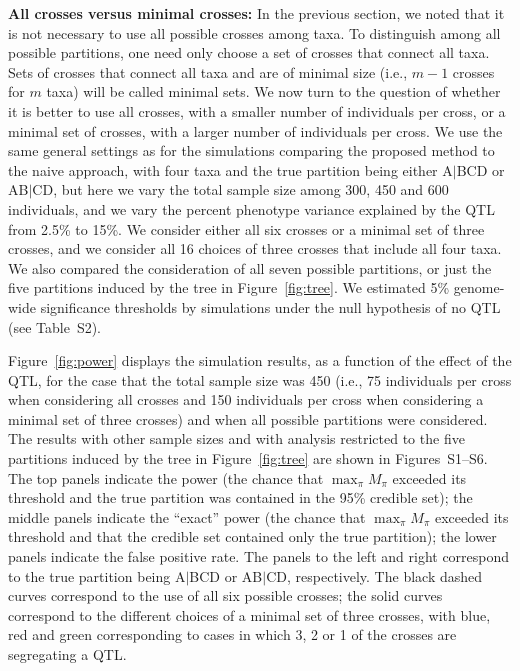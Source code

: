 \documentclass[12pt,letterpaper]{article}
\begin{document}
\textbf{All crosses versus minimal crosses:} In the previous section, we noted
that it is not necessary to use all possible crosses among taxa.  
To
distinguish among all possible partitions,
one need only choose a set of crosses that connect all taxa.
Sets of crosses that connect all taxa and are of minimal size (i.e.,
$m-1$ crosses for $m$ taxa) will be called minimal sets.  We
now turn to the question of whether it is better to use all crosses,
with a smaller number of individuals per cross, or a minimal set of 
crosses, with a larger number of individuals per cross.  We use the
same general settings as for the simulations comparing the proposed
method to the naive approach, with four taxa and the true partition
being either A$|$BCD or AB$|$CD, but here we vary the total sample size
among 300, 450 and 600 individuals, and we vary the percent phenotype
variance explained by the QTL from 2.5\% to 15\%.  We consider either
all six crosses or a minimal set of three crosses, and we consider all
16 choices of three crosses that include all four taxa.  We also
compared the consideration of all seven possible partitions, or just
the five partitions induced by the tree in Figure~\ref{fig:tree}.  We estimated 5\%
genome-wide significance thresholds by simulations under
the null hypothesis of no QTL (see Table~S2).

Figure~\ref{fig:power} displays the simulation results, as a function
of the effect of the QTL, for the case that the total sample size was
450 (i.e., 75 individuals per cross when considering all crosses and
150 individuals per cross when considering a minimal set of three
crosses) and when all possible partitions were considered.  The
results with other sample sizes and with analysis restricted to the
five partitions induced by the tree in Figure~\ref{fig:tree} are shown
in Figures~S1--S6.  The top panels indicate the power (the chance that
$\max_\pi M_\pi$ exceeded its threshold and the true partition was
contained in the 95\% credible set); the middle panels indicate the
``exact'' power (the chance that $\max_\pi M_\pi$ exceeded its
threshold and that the credible set contained only the true
partition); the lower panels indicate the false positive rate.  The
panels to the left and right correspond to the true partition being
A$|$BCD or AB$|$CD, respectively.  The black dashed curves correspond
to the use of all six possible crosses; the solid curves correspond to
the different choices of a minimal set of three crosses, with blue,
red and green corresponding to cases in which 3, 2 or 1 of the crosses
are segregating a QTL.
\end{document}

